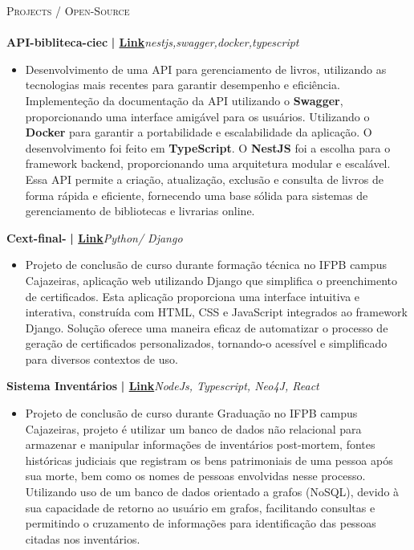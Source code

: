\documentclass[a4paper]{article}
\newcommand{\lineunder} {
    \vspace*{-8pt} \\
    \hspace*{-18pt} \hrulefill \\
}
\newcommand{\header} [1] {
    {\hspace*{-18pt}\vspace*{6pt} \textsc{#1}}
    \vspace*{-6pt} \lineunder
}
\begin{document}
%
%
\header{Projects / Open-Source}
\vspace{2mm}
{\textbf{API-bibliteca-ciec}}\textbf{ | \href{https://github.com/Alttabcorp/API-bibliteca_siec}{Link}}\hfill{\sl nestjs,swagger,docker,typescript}\\
\vspace{-3mm}
\begin{itemize} \itemsep -3pt
    \item[] Desenvolvimento de uma API para gerenciamento de livros, utilizando as tecnologias mais recentes para garantir desempenho e eficiência.
        Implementeção da documentação da API utilizando o \textbf{Swagger}, proporcionando uma interface amigável para os usuários. Utilizando o \textbf{Docker} para garantir a portabilidade e escalabilidade da aplicação.
        O desenvolvimento foi feito em \textbf{TypeScript}. O \textbf{NestJS} foi a escolha para o framework backend, proporcionando uma arquitetura modular e escalável.
        Essa API permite a criação, atualização, exclusão e consulta de livros de forma rápida e eficiente, fornecendo uma base sólida para sistemas de gerenciamento de bibliotecas e livrarias online.
\end{itemize}
\vspace*{3mm}
{\textbf{Cext-final-}}\textbf{ | \href{https://github.com/bodescorp/Cext-final-}{Link}}\hfill{\sl Python/ Django }\\
\vspace{-3mm}
\begin{itemize} \itemsep -3pt
    \item[] Projeto de conclusão de curso durante formação técnica no IFPB campus Cajazeiras, aplicação web utilizando Django que simplifica o preenchimento de certificados. Esta aplicação proporciona uma interface intuitiva
        e interativa, construída com HTML, CSS e JavaScript integrados ao framework Django. Solução oferece uma maneira eficaz de automatizar o processo de geração de certificados personalizados, tornando-o acessível e
        simplificado para diversos contextos de uso.
\end{itemize}
\vspace*{3mm}
{\textbf{Sistema Inventários}}\textbf{ | \href{https://repositorio.ifpb.edu.br/handle/177683/2898}{Link}}\hfill{\sl NodeJs, Typescript, Neo4J, React }\\
\vspace{-3mm}
\begin{itemize} \itemsep -3pt
    \item[] Projeto de conclusão de curso durante Graduação no IFPB campus Cajazeiras, projeto é utilizar um banco de dados não relacional para armazenar e manipular informações de inventários post-mortem, fontes históricas judiciais
        que registram os bens patrimoniais de uma pessoa após sua morte, bem como os nomes de pessoas envolvidas nesse processo. Utilizando uso de um banco de dados orientado a grafos (NoSQL), devido à sua capacidade de retorno ao usuário em grafos,
        facilitando consultas e permitindo o cruzamento de informações para identificação das pessoas citadas nos inventários.
\end{itemize}
\end{document}
